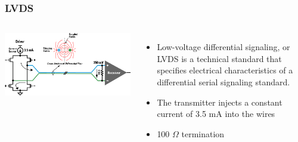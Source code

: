\documentclass[aspectratio=169]{beamer}
\begin{document}
	\begin{frame}[noframenumbering]
		\frametitle{LVDS}
		\begin{columns}
			\begin{center}
				\includegraphics[width=0.95 \textwidth]{IMG/LVDS.png}
			\end{center}
			\begin{itemize}
				\item Low-voltage differential signaling, or LVDS is a technical standard that specifies electrical characteristics of a differential serial signaling standard.
				\item The transmitter injects a constant current of 3.5 mA into the wires
				\item 100 $\Omega$ termination
			\end{itemize}
		\end{columns}
	\end{frame}

\end{document}
